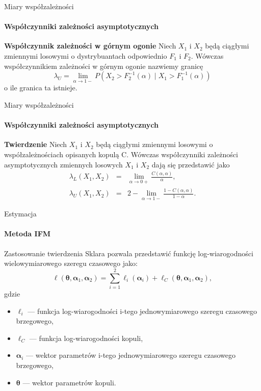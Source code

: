 \documentclass[a4paper, 11pt]{beamer}
\begin{document}
	\begin{frame}{Miary współzależności}
		\framesubtitle{Współczynniki zależności asymptotycznych}
		\begin{block}{\textbf{Współczynnik zależności w górnym ogonie}}
			Niech $X_{1}$ i $X_{2}$ będą ciągłymi zmiennymi losowymi o dystrybuantach
			odpowiednio $F_{1}$ i $F_{2}.$ Wówczas współczynnikiem zależności w
			górnym ogonie nazwiemy granicę \[
				\lambda_{U} = 
					\lim_{\alpha\rightarrow1-}P\left(
						X_{2}>F_{2}^{-1}\left(\alpha\right)\mid X_{1}>F_{1}^{-1}\left(\alpha\right)
					\right)
			\] o ile granica ta istnieje.
		\end{block}
	\end{frame}
	
	\begin{frame}{Miary współzależności}
		\framesubtitle{Współczynniki zależności asymptotycznych}
		\begin{block}{\textbf{Twierdzenie}}
			Niech $X_{1}$ i $X_{2}$ będą ciągłymi zmiennymi losowymi o współzależnościach opisanych kopulą C.
			Wówczas współczynniki zależności asymptotycznych zmiennych losowych $X_{1}$ i $X_{2}$ dają się przedstawić jako \begin{eqnarray*}
				\lambda_{L}\left(X_{1},X_{2}\right) & = & \lim_{\alpha\rightarrow0+}\frac{C\left(\alpha,\alpha\right)}{\alpha},\\
				\lambda_{U}\left(X_{1},X_{2}\right) & = & 2-\lim_{\alpha\rightarrow1-}\frac{1-C\left(\alpha,\alpha\right)}{1-\alpha}.
			\end{eqnarray*}
		\end{block}
	\end{frame}
	
	\begin{frame}{Estymacja}
		\framesubtitle{Metoda IFM}
		Zastosowanie twierdzenia Sklara pozwala przedstawić funkcję log-wiarogodności
		wielowymiarowego szeregu czasowego jako: \[
			\ell\left(\boldsymbol{\theta}, \boldsymbol{\alpha}_1, \boldsymbol{\alpha}_2\right) =
				\sum_{i=1}^{2} \ell_{i}\left(\boldsymbol{\alpha}_i\right) +
				\ell_C\left(\boldsymbol{\theta}, \boldsymbol{\alpha}_1, \boldsymbol{\alpha}_2\right),
		\] gdzie
		\begin{itemize}
			\item $\ell_i$ --- funkcja log-wiarogodności i-tego jednowymiarowego szeregu czasowego brzegowego,
			\item $\ell_C$ --- funkcja log-wiarogodności kopuli,
			\item $\boldsymbol{\alpha}_i$ --- wektor parametrów i-tego jednowymiarowego szeregu czasowego brzegowego,
			\item $\boldsymbol{\theta}$ --- wektor parametrów kopuli.
		\end{itemize}
	\end{frame}
	
\end{document}
